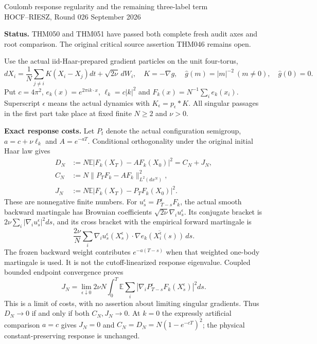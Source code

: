 \documentclass[11pt]{article}
\newcommand{\E}{\mathbb E}
\begin{document}
\begin{center}
{\large Coulomb response regularity and the remaining three-label term}\\[4pt]
HOCF--RIESZ, Round 026  September 2026
\end{center}
\noindent\textbf{Status.} THM050 and THM051 have passed both complete fresh audit axes and root comparison. The original critical source assertion THM046 remains open.

Use the actual iid-Haar-prepared gradient particles on the unit four-torus,
\[
 dX_i=\frac1N\sum_{j\ne i}K(X_i-X_j)dt+\sqrt{2\nu}\,dW_i,
 \quad K=-\nabla g,\quad \widehat g(m)=|m|^{-2}\ (m\ne0),\quad\widehat g(0)=0.
\]
Put $c=4\pi^2$, $e_k(x)=e^{2\pi i k\cdot x}$, $\ell_k=c|k|^2$ and
$F_k(x)=N^{-1}\sum_i e_k(x_i)$. Superscript $\epsilon$ means the actual dynamics with $K_\epsilon=p_\epsilon*K$. All singular passages in the first part take place at fixed finite $N\ge2$ and $\nu>0$.

\noindent\textbf{Exact response costs.}
Let $P_t$ denote the actual configuration semigroup, $a=c+\nu\ell_k$ and $A=e^{-aT}$. Conditional orthogonality under the original initial Haar law gives
\[
 \begin{split}
 D_N&:=N\E|F_k(X_T)-AF_k(X_0)|^2=C_N+J_N,\\
 C_N&:=N\|P_TF_k-AF_k\|_{L^2(dx^N)}^2,\\
 J_N&:=N\E|F_k(X_T)-P_TF_k(X_0)|^2.
 \end{split}
\]
These are nonnegative finite numbers. For $u_s^\epsilon=P_{T-s}^\epsilon F_k$, the actual smooth backward martingale has Brownian coefficients $\sqrt{2\nu}\nabla_i u_s^\epsilon$. Its conjugate bracket is $2\nu\sum_i|\nabla_i u_s^\epsilon|^2ds$, and its cross bracket with the empirical forward martingale is
\[
 \frac{2\nu}{N}\sum_i\nabla_i u_s^\epsilon(X_s^\epsilon)
       \cdot\overline{\nabla e_k(X_i^\epsilon(s))}\,ds.
\]
The frozen backward weight contributes $e^{-a(T-s)}$ when that weighted one-body martingale is used. It is not the cutoff-linearized response eigenvalue. Coupled bounded endpoint convergence proves
\[
 J_N=\lim_{\epsilon\downarrow0}2\nu N\int_0^T
       \E\sum_i|\nabla_iP_{T-s}^\epsilon F_k(X_s^\epsilon)|^2ds.
\]
This is a limit of costs, with no assertion about limiting singular gradients. Thus $D_N\to0$ if and only if both $C_N,J_N\to0$. At $k=0$ the expressly artificial comparison $a=c$ gives $J_N=0$ and $C_N=D_N=N(1-e^{-cT})^2$; the physical constant-preserving response is unchanged.
\end{document}
